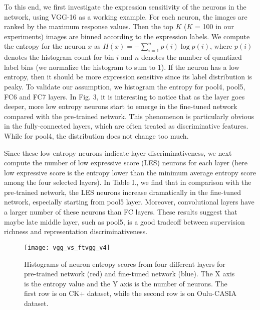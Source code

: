 \documentclass[a4paper, 10pt, conference]{ieeeconf}      %
\begin{document}
To this end, we first investigate the expression sensitivity of the neurons in the network, using VGG-16 as a working example. For each neuron, the images are ranked by the maximum response values. Then the top $K$ ($K$ = 100 in our experiments) images are binned according to the expression labels. We compute the entropy for the neuron  $x$ as $H(x) = - \sum_{i=1}^n p(i) \log p(i)$, where $p(i)$ denotes the histogram count for bin $i$ and $n$ denotes the number of quantized label bins (we normalize the histogram to sum to 1). If the neuron has a low entropy, then it should be more expression sensitive since its label distribution is peaky. To validate our assumption, we histogram the entropy for pool4, pool5, FC6 and FC7 layers. In Fig. 3, it is interesting to notice that as the layer goes deeper, more low entropy neurons start to emerge in the fine-tuned network compared with the pre-trained network. This phenomenon is particularly obvious in the fully-connected layers, which are often treated as discriminative features. While for pool4, the distribution does not change too much. 

Since these low entropy neurons indicate layer discriminativeness, we next compute the number of low expressive score (LES) neurons for each layer (here low expressive score is the entropy lower than the minimum average entropy score among the four selected layers). In Table I., we find that in comparison with the pre-trained network, the LES neurons increase dramatically in the fine-tuned network, especially starting from pool5 layer. Moreover, convolutional layers have a larger number of these neurons than FC layers. 
These results suggest that maybe late middle layer, such as pool5, is a good tradeoff between supervision richness and representation discriminativeness.


\begin{figure*}
  \texttt{[image: vgg\_vs\_ftvgg\_v4]}
  \caption{Histograms of neuron entropy scores from four different layers for pre-trained network (red) and fine-tuned network (blue). The X axis is the entropy value and the Y axis is the number of neurons. The first row is on CK+ dataset, while the second row is on Oulu-CASIA dataset.}
  \label{vgg_vs_ftvgg}
  \vspace{-1mm}
\end{figure*}
\end{document}
